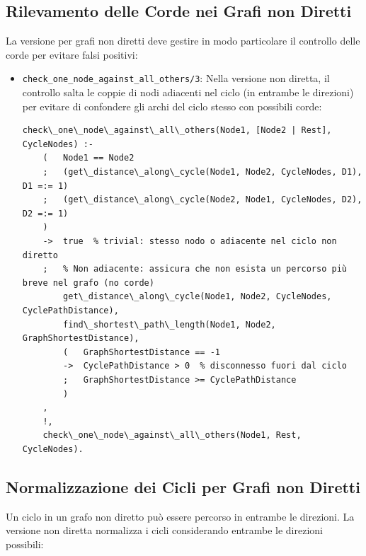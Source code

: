 \documentclass[12pt,a4paper]{article}
\begin{document}
\subsection{Rilevamento delle Corde nei Grafi non Diretti}
La versione per grafi non diretti deve gestire in modo particolare il controllo delle corde per evitare falsi positivi:

\begin{itemize}
\item \texttt{check\_one\_node\_against\_all\_others/3}: Nella versione non diretta, il controllo salta le coppie di nodi adiacenti nel ciclo (in entrambe le direzioni) per evitare di confondere gli archi del ciclo stesso con possibili corde:

\begin{lstlisting}[style=prologstyle, basicstyle=\ttfamily\footnotesize]
check\_one\_node\_against\_all\_others(Node1, [Node2 | Rest], CycleNodes) :-
    (   Node1 == Node2
    ;   (get\_distance\_along\_cycle(Node1, Node2, CycleNodes, D1), D1 =:= 1)
    ;   (get\_distance\_along\_cycle(Node2, Node1, CycleNodes, D2), D2 =:= 1)
    )
    ->  true  % trivial: stesso nodo o adiacente nel ciclo non diretto
    ;   % Non adiacente: assicura che non esista un percorso più breve nel grafo (no corde)
        get\_distance\_along\_cycle(Node1, Node2, CycleNodes, CyclePathDistance),
        find\_shortest\_path\_length(Node1, Node2, GraphShortestDistance),
        (   GraphShortestDistance == -1
        ->  CyclePathDistance > 0  % disconnesso fuori dal ciclo
        ;   GraphShortestDistance >= CyclePathDistance
        )
    ,
    !,
    check\_one\_node\_against\_all\_others(Node1, Rest, CycleNodes).
\end{lstlisting}
\end{itemize}

\subsection{Normalizzazione dei Cicli per Grafi non Diretti}
Un ciclo in un grafo non diretto può essere percorso in entrambe le direzioni. La versione non diretta normalizza i cicli considerando entrambe le direzioni possibili:
\end{document}
